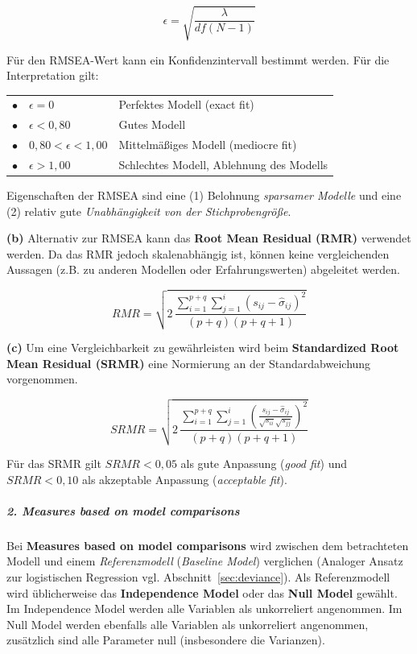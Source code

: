\documentclass{article}
\numberwithin{equation}{section}
\begin{document}
\begin{equation}
\epsilon = \sqrt{\frac{\lambda}{df(N-1)}}
\end{equation}

Für den RMSEA-Wert kann ein Konfidenzintervall bestimmt werden. Für die Interpretation gilt:

\begin{tabular}{lll}
$\bullet$ & $\epsilon = 0$ & Perfektes Modell (exact fit)\\
$\bullet$ & $\epsilon < 0,80$ & Gutes Modell\\
$\bullet$ & $0,80 < \epsilon < 1,00$ & Mittelmäßiges Modell (mediocre fit)\\
$\bullet$ & $\epsilon > 1,00$ & Schlechtes Modell, Ablehnung des Modells
\end{tabular}

Eigenschaften der RMSEA sind eine (1) Belohnung \emph{sparsamer Modelle} und eine (2) relativ gute \emph{Unabhängigkeit von der Stichprobengröße}.

\textbf{(b)} Alternativ zur RMSEA kann das \textbf{Root Mean Residual (RMR)} verwendet werden. Da das RMR jedoch skalenabhängig ist, können keine vergleichenden Aussagen (z.B. zu anderen Modellen oder Erfahrungswerten) abgeleitet werden.

\begin{equation}
RMR = \sqrt{2\, \frac{\sum_{i=1}^{p+q} \sum_{j=1}^{i} (s_{ij} - \hat \sigma_{ij})^2}{(p+q)(p+q+1)}}
\end{equation}

\textbf{(c)} Um eine Vergleichbarkeit zu gewährleisten wird beim \textbf{Standardized Root Mean Residual (SRMR)} eine Normierung an der Standardabweichung vorgenommen.

\begin{equation}
SRMR = \sqrt{2\, \frac{\sum_{i=1}^{p+q} \sum_{j=1}^{i} (\frac{s_{ij} - \hat \sigma_{ij}}{\sqrt{s_{ii}}\sqrt{s_{jj}}})^2}{(p+q)(p+q+1)}}
\end{equation}

Für das SRMR gilt $SRMR < 0,05$ als gute Anpassung (\emph{good fit}) und $SRMR < 0,10$ als akzeptable Anpassung (\emph{acceptable fit}).

\subparagraph*{2. Measures based on model comparisons}

Bei \textbf{Measures based on model comparisons} wird zwischen dem betrachteten Modell und einem \emph{Referenzmodell} (\emph{Baseline Model}) verglichen (Analoger Ansatz zur logistischen Regression vgl. Abschnitt~\ref{sec:deviance}). Als Referenzmodell wird üblicherweise das \textbf{Independence Model} oder das \textbf{Null Model} gewählt. Im Independence Model werden alle Variablen als unkorreliert angenommen. Im Null Model werden ebenfalls alle Variablen als unkorreliert angenommen, zusätzlich sind alle Parameter null (insbesondere die Varianzen).
\end{document}
